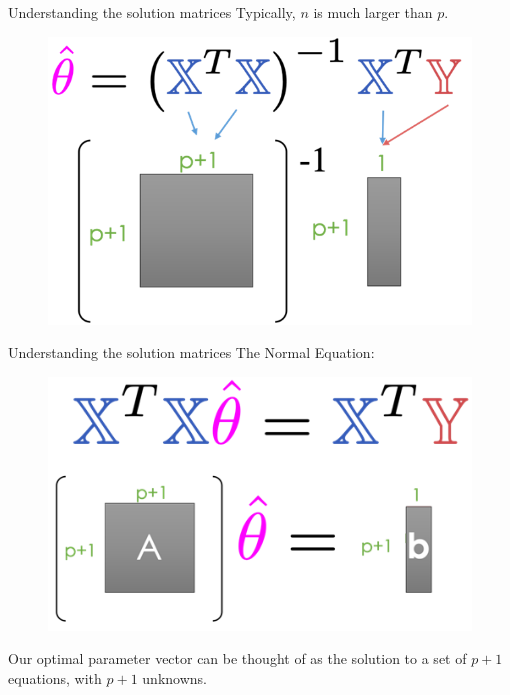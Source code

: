 \documentclass[aspectratio=169]{../latex_main/tntbeamer}  %
\begin{document}
	
	\begin{frame}{Understanding the solution matrices}
	Typically, $n$ is much larger than $p$.
	    \begin{figure}
	        \centering
	        \includegraphics[scale=.45]{Bild14}
	    \end{figure}
	\end{frame}
	
	\begin{frame}{Understanding the solution matrices}
	    The Normal Equation:

	    \begin{figure}
	        \centering
	        \includegraphics[scale=.45]{Bild15}
	    \end{figure}
	    Our optimal parameter vector can be thought of as the solution to a set of $p + 1$ equations, with $p + 1$ unknowns. 

	\end{frame}
	
\end{document}

